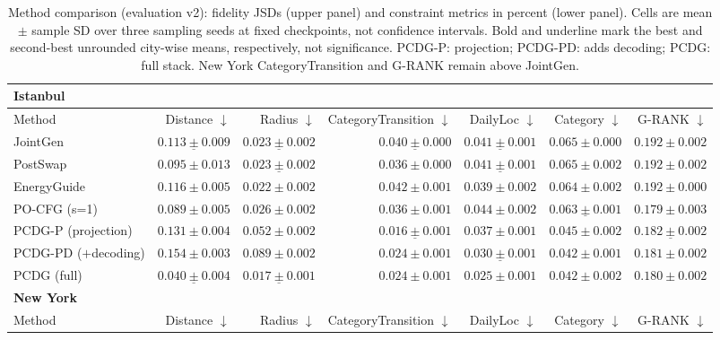 \begin{table}[t]
\centering
\footnotesize
\setlength{\tabcolsep}{3pt}
\caption{Method comparison (evaluation v2): fidelity JSDs (upper panel) and constraint
metrics in percent (lower panel). Cells are mean $\pm$ sample SD over three sampling seeds
at fixed checkpoints, not confidence intervals. Bold and underline mark the best and second-best
unrounded city-wise means, respectively, not significance. \textsc{PCDG-P}: projection; \textsc{PCDG-PD}: adds decoding;
\textsc{PCDG}: full stack. New York CategoryTransition and G-RANK remain above JointGen.}
\label{tab:method-jsd}
\label{tab:method}
\begin{tabular}{lrrrrrr}
\toprule
\multicolumn{7}{l}{\textbf{Istanbul}} \\
\midrule
Method & Distance $\downarrow$ & Radius $\downarrow$ & CategoryTransition $\downarrow$ & DailyLoc $\downarrow$ & Category $\downarrow$ & G-RANK $\downarrow$ \\
\midrule
JointGen & $\underline{0.113\pm 0.009}$ & $\underline{0.023\pm 0.002}$ & $\underline{0.040\pm 0.000}$ & $\underline{0.041\pm 0.001}$ & $0.065\pm 0.000$ & $0.192\pm 0.002$ \\
PostSwap & $0.095\pm 0.013$ & $\underline{0.023\pm 0.002}$ & $\mathbf{0.036\pm 0.000}$ & $\underline{0.041\pm 0.001}$ & $0.065\pm 0.002$ & $0.192\pm 0.002$ \\
EnergyGuide & $0.116\pm 0.005$ & $\mathbf{0.022\pm 0.002}$ & $0.042\pm 0.001$ & $\mathbf{0.039\pm 0.002}$ & $0.064\pm 0.002$ & $0.192\pm 0.000$ \\
PO-CFG (s=1) & $\mathbf{0.089\pm 0.005}$ & $0.026\pm 0.002$ & $\mathbf{0.036\pm 0.001}$ & $0.044\pm 0.002$ & $\underline{0.063\pm 0.001}$ & $\mathbf{0.179\pm 0.003}$ \\
\midrule
\textsc{PCDG-P} (projection) & $0.131\pm 0.004$ & $0.052\pm 0.002$ & $\underline{0.016\pm 0.001}$ & $0.037\pm 0.001$ & $\mathbf{0.045\pm 0.002}$ & $\underline{0.182\pm 0.002}$ \\
\textsc{PCDG-PD} ($+$decoding) & $0.154\pm 0.003$ & $0.089\pm 0.002$ & $0.024\pm 0.001$ & $\underline{0.030\pm 0.001}$ & $\mathbf{0.042\pm 0.001}$ & $\mathbf{0.181\pm 0.002}$ \\
\textsc{PCDG} (full) & $\underline{0.040\pm 0.004}$ & $\underline{0.017\pm 0.001}$ & $0.024\pm 0.001$ & $\mathbf{0.025\pm 0.001}$ & $\mathbf{0.042\pm 0.002}$ & $\mathbf{0.180\pm 0.002}$ \\
\midrule
\multicolumn{7}{l}{\textbf{New York}} \\
\midrule
Method & Distance $\downarrow$ & Radius $\downarrow$ & CategoryTransition $\downarrow$ & DailyLoc $\downarrow$ & Category $\downarrow$ & G-RANK $\downarrow$ \\

\end{tabular}
\end{table}
